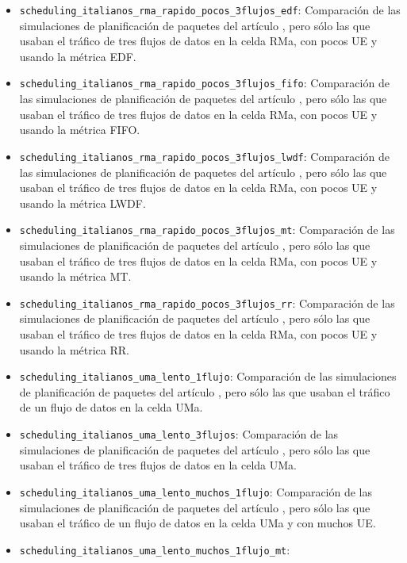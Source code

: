 \documentclass[12pt]{report} %
\begin{document}
\begin{itemize}
Comparación de las simulaciones de planificación de paquetes del artículo \cite{RefWorks:26},
pero sólo las que usaban el tráfico de tres flujos de datos en la celda RMa, con pocos UE y usando la métrica BET.
\item \verb|scheduling_italianos_rma_rapido_pocos_3flujos_edf|:
Comparación de las simulaciones de planificación de paquetes del artículo \cite{RefWorks:26},
pero sólo las que usaban el tráfico de tres flujos de datos en la celda RMa, con pocos UE y usando la métrica EDF.
\item \verb|scheduling_italianos_rma_rapido_pocos_3flujos_fifo|:
Comparación de las simulaciones de planificación de paquetes del artículo \cite{RefWorks:26},
pero sólo las que usaban el tráfico de tres flujos de datos en la celda RMa, con pocos UE y usando la métrica FIFO.
\item \verb|scheduling_italianos_rma_rapido_pocos_3flujos_lwdf|:
Comparación de las simulaciones de planificación de paquetes del artículo \cite{RefWorks:26},
pero sólo las que usaban el tráfico de tres flujos de datos en la celda RMa, con pocos UE y usando la métrica LWDF.
\item \verb|scheduling_italianos_rma_rapido_pocos_3flujos_mt|:
Comparación de las simulaciones de planificación de paquetes del artículo \cite{RefWorks:26},
pero sólo las que usaban el tráfico de tres flujos de datos en la celda RMa, con pocos UE y usando la métrica MT.
\item \verb|scheduling_italianos_rma_rapido_pocos_3flujos_rr|:
Comparación de las simulaciones de planificación de paquetes del artículo \cite{RefWorks:26},
pero sólo las que usaban el tráfico de tres flujos de datos en la celda RMa, con pocos UE y usando la métrica RR.
\item \verb|scheduling_italianos_uma_lento_1flujo|:
Comparación de las simulaciones de planificación de paquetes del artículo \cite{RefWorks:26},
pero sólo las que usaban el tráfico de un flujo de datos en la celda UMa.
\item \verb|scheduling_italianos_uma_lento_3flujos|:
Comparación de las simulaciones de planificación de paquetes del artículo \cite{RefWorks:26},
pero sólo las que usaban el tráfico de tres flujos de datos en la celda UMa.
\item \verb|scheduling_italianos_uma_lento_muchos_1flujo|:
Comparación de las simulaciones de planificación de paquetes del artículo \cite{RefWorks:26},
pero sólo las que usaban el tráfico de un flujo de datos en la celda UMa y con muchos UE.
\item \verb|scheduling_italianos_uma_lento_muchos_1flujo_mt|:

\end{itemize}
\end{document}
